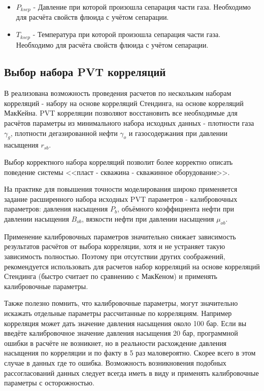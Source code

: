 \begin{itemize}
\item $P_{ksep}$ - Давление при которой произошла сепарация части газа. Необходимо для расчёта свойств флюида с учётом сепарации. 

\item $T_{ksep}$ - Температура при которой произошла сепарация части газа. Необходимо для расчёта свойств флюида с учётом сепарации. 

\end{itemize}

\subsection{Выбор набора PVT корреляций}
В \unf{} реализована возможность проведения расчетов по нескольким наборам корреляций - набору на основе корреляций Стендинга, на основе корреляций МакКейна. PVT корреляции позволяют восстановить все необходимые для расчётов параметры из минимального набора исходных данных - плотности газа $\gamma_g$, плотности дегазированной нефти $\gamma_o$ и газосодержания при давлении насыщения $r_{sb}$. 


Выбор корректного набора корреляций позволит более корректно описать поведение системы <<пласт - скважина - скважинное оборудование>>. 

На практике для повышения точности моделирования широко применяется задание расширенного набора исходных PVT параметров - калибровочных параметров: давления насыщения $P_b$, объёмного коэффициента нефти при давлении насыщения $B_{ob}$, вязкости нефти при давлении насыщения $\mu_{ob}$. 

Применение калибровочных параметров значительно снижает зависимость результатов расчётов от выбора корреляции, хотя и не устраняет такую зависимость полностью. Поэтому при отсутствии других соображений, рекомендуется использовать для расчетов набор корреляций на основе корреляций Стендинга (быстро считает по сравнению с МакКеном) и применять калибровочные параметры.

Также полезно помнить, что калибровочные параметры, могут значительно искажать отдельные параметры рассчитанные по корреляциям. Например корреляция может дать значение давления насыщения около 100 бар. Если вы введёте калибровочное значение давления насыщения 20 бар, программной ошибки в расчёте не возникнет, но в реальности расхождение давления насыщения по корреляции и по факту в 5 раз маловероятно. Скорее всего в этом случае в данных где то ошибка. Возможность возникновения подобных рассогласований данных следует всегда иметь в виду и применять калибровочные параметры с осторожностью.  

